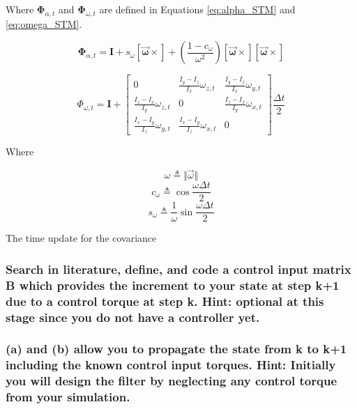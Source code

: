 Where $\boldsymbol{\Phi}_{\alpha,t}$ and $\boldsymbol{\Phi}_{\omega,t}$ are defined in Equations \ref{eq:alpha_STM} and \ref{eq:omega_STM}.

\begin{equation} \label{eq:alpha_STM}
    \boldsymbol{\Phi}_{\alpha,t} = \boldsymbol{I} + s_{\omega} \boldsymbol{\left[ \vec{\omega} \times \right]} + \left( \frac{1 - c_{\omega}}{\omega ^2} \right) \boldsymbol{\left[ \vec{\omega} \times \right]} \boldsymbol{\left[ \vec{\omega} \times \right]}
\end{equation}

\begin{equation} \label{eq:omega_STM}
    \Phi_{\omega,t} = \boldsymbol{I} + \begin{bmatrix}
        0 & \frac{I_y - I_z}{I_x} \omega_{z,t} & \frac{I_y - I_z}{I_x} \omega_{y,t} \\
        \frac{I_z - I_x}{I_y} \omega_{z,t} & 0 & \frac{I_z - I_x}{I_y} \omega_{x,t} \\
        \frac{I_x - I_y}{I_z} \omega_{y,t} & \frac{I_x - I_y}{I_z} \omega_{x,t} & 0
    \end{bmatrix} \frac{\Delta t}{2}
\end{equation}

Where

\begin{equation*}
    \omega \triangleq \Vert \vec{\omega} \Vert
\end{equation*}
\begin{equation*}
    c_{\omega} \triangleq \cos{\frac{\omega \Delta t}{2}}
\end{equation*}
\begin{equation*}
    s_{\omega} \triangleq \frac{1}{\omega} \sin{\frac{\omega \Delta t}{2}}
\end{equation*}

The time update for the covariance 

\subsubsection{Search in literature, define, and code a control input matrix B which provides the increment to your state at step k+1 due to a control torque at step k. Hint: optional at this stage since you do not have a controller yet.}


\subsubsection{(a) and (b) allow you to propagate the state from k to k+1 including the known control input torques. Hint: Initially you will design the filter by neglecting any control torque from your simulation.}


